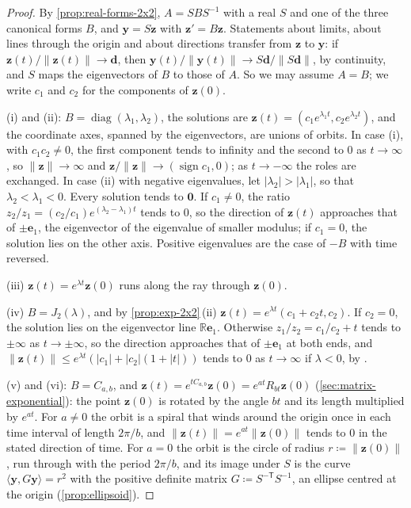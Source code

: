 \begin{proof}
By \cref{prop:real-forms-2x2}, $A=SBS^{-1}$ with a real $S$ and one of the three canonical forms $B$, and $\mathbf y=S\mathbf z$ with $\mathbf z'=B\mathbf z$. Statements about limits, about lines through the origin and about directions transfer from $\mathbf z$ to $\mathbf y$: if $\mathbf z(t)/\|\mathbf z(t)\|\to\mathbf d$, then $\mathbf y(t)/\|\mathbf y(t)\|\to S\mathbf d/\|S\mathbf d\|$, by continuity, and $S$ maps the eigenvectors of $B$ to those of $A$. So we may assume $A=B$; we write $c_1$ and $c_2$ for the components of $\mathbf z(0)$.

(i) and (ii): $B=\operatorname{diag}(\lambda_1,\lambda_2)$, the solutions are $\mathbf z(t)=(c_1e^{\lambda_1t},c_2e^{\lambda_2t})$, and the coordinate axes, spanned by the eigenvectors, are unions of orbits. In case (i), with $c_1c_2\ne0$, the first component tends to infinity and the second to $0$ as $t\to\infty$, so $\|\mathbf z\|\to\infty$ and $\mathbf z/\|\mathbf z\|\to(\operatorname{sign}c_1,0)$; as $t\to-\infty$ the roles are exchanged. In case (ii) with negative eigenvalues, let $|\lambda_2|>|\lambda_1|$, so that $\lambda_2<\lambda_1<0$. Every solution tends to $\mathbf 0$. If $c_1\ne0$, the ratio $z_2/z_1=(c_2/c_1)e^{(\lambda_2-\lambda_1)t}$ tends to $0$, so the direction of $\mathbf z(t)$ approaches that of $\pm\mathbf e_1$, the eigenvector of the eigenvalue of smaller modulus; if $c_1=0$, the solution lies on the other axis. Positive eigenvalues are the case of $-B$ with time reversed.

(iii) $\mathbf z(t)=e^{\lambda t}\mathbf z(0)$ runs along the ray through $\mathbf z(0)$.

(iv) $B=J_2(\lambda)$, and by \cref{prop:exp-2x2}\,(ii) $\mathbf z(t)=e^{\lambda t}(c_1+c_2t,c_2)$. If $c_2=0$, the solution lies on the eigenvector line $\mathbb R\mathbf e_1$. Otherwise $z_1/z_2=c_1/c_2+t$ tends to $\pm\infty$ as $t\to\pm\infty$, so the direction approaches that of $\pm\mathbf e_1$ at both ends, and $\|\mathbf z(t)\|\le e^{\lambda t}(|c_1|+|c_2|(1+|t|))$ tends to $0$ as $t\to\infty$ if $\lambda<0$, by .

(v) and (vi): $B=C_{a,b}$, and $\mathbf z(t)=e^{tC_{a,b}}\mathbf z(0)=e^{at}R_{bt}\mathbf z(0)$ (\cref{sec:matrix-exponential}): the point $\mathbf z(0)$ is rotated by the angle $bt$ and its length multiplied by $e^{at}$. For $a\ne0$ the orbit is a spiral that winds around the origin once in each time interval of length $2\pi/b$, and $\|\mathbf z(t)\|=e^{at}\|\mathbf z(0)\|$ tends to $0$ in the stated direction of time. For $a=0$ the orbit is the circle of radius $r\coloneqq\|\mathbf z(0)\|$, run through with the period $2\pi/b$, and its image under $S$ is the curve $\langle\mathbf y,G\mathbf y\rangle=r^2$ with the positive definite matrix $G\coloneqq S^{-\mathsf T}S^{-1}$, an ellipse centred at the origin (\cref{prop:ellipsoid}).
\end{proof}

